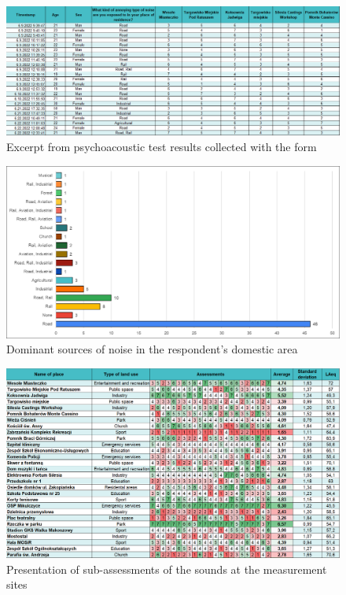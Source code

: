\documentclass[a4paper,10pt]{article}
\begin{document}
\begin{figure}[H]
  \includegraphics[scale=.5]{fig9.png}
  \centering
  \caption{Excerpt from psychoacoustic test results collected with the form}
  \label{formData}
\end{figure}
\begin{figure}[H]
  \includegraphics[scale=.5]{fig10.png}
  \centering
  \caption{Dominant sources of noise in the respondent’s domestic area}
  \label{SourcesOfNoise}
\end{figure}
\begin{figure}[H]
  \includegraphics[scale=.25]{fig11.png}
  \centering
  \caption{Presentation of sub-assessments of the sounds at the measurement sites}
  \label{rawData}
\end{figure}
\end{document}
